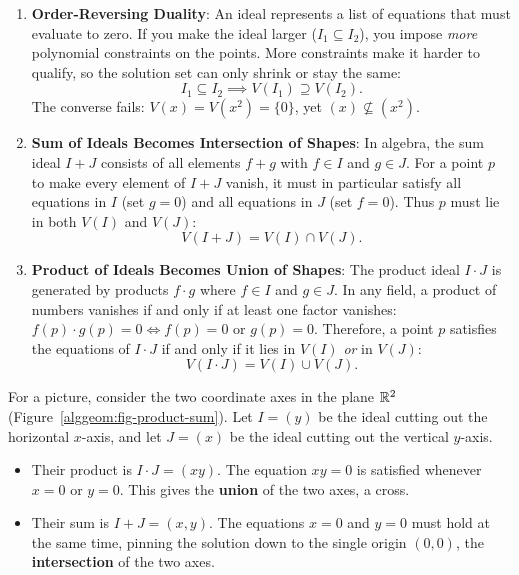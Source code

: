\begin{enumerate}
  \item \textbf{Order-Reversing Duality}: An ideal represents a list of equations that must evaluate to zero. If you make the ideal larger ($I_1 \subseteq I_2$), you impose \emph{more} polynomial constraints on the points. More constraints make it harder to qualify, so the solution set can only shrink or stay the same:
  \[
  I_1 \subseteq I_2 \implies V(I_1) \supseteq V(I_2).
  \]
  The converse fails: $V(x) = V(x^2) = \{0\}$, yet $(x) \not\subseteq (x^2)$.
  \item \textbf{Sum of Ideals Becomes Intersection of Shapes}: In algebra, the sum ideal $I + J$ consists of all elements $f + g$ with $f \in I$ and $g \in J$. For a point $p$ to make every element of $I + J$ vanish, it must in particular satisfy all equations in $I$ (set $g = 0$) and all equations in $J$ (set $f = 0$). Thus $p$ must lie in both $V(I)$ and $V(J)$:
  \[
  V(I + J) = V(I) \cap V(J).
  \]
  \item \textbf{Product of Ideals Becomes Union of Shapes}: The product ideal $I \cdot J$ is generated by products $f \cdot g$ where $f \in I$ and $g \in J$. In any field, a product of numbers vanishes if and only if at least one factor vanishes: $f(p) \cdot g(p) = 0 \iff f(p) = 0 \text{ or } g(p) = 0$. Therefore, a point $p$ satisfies the equations of $I \cdot J$ if and only if it lies in $V(I)$ \emph{or} in $V(J)$:
  \[
  V(I \cdot J) = V(I) \cup V(J).
  \]
\end{enumerate}

For a picture, consider the two coordinate axes in the plane $\mathbb{R}^2$ (Figure~\ref{alggeom:fig-product-sum}). Let $I = (y)$ be the ideal cutting out the horizontal $x$-axis, and let $J = (x)$ be the ideal cutting out the vertical $y$-axis.
\begin{itemize}
  \item Their product is $I \cdot J = (xy)$. The equation $xy = 0$ is satisfied whenever $x = 0$ or $y = 0$. This gives the \textbf{union} of the two axes, a cross.
  \item Their sum is $I + J = (x, y)$. The equations $x = 0$ and $y = 0$ must hold at the same time, pinning the solution down to the single origin $(0, 0)$, the \textbf{intersection} of the two axes.
\end{itemize}

